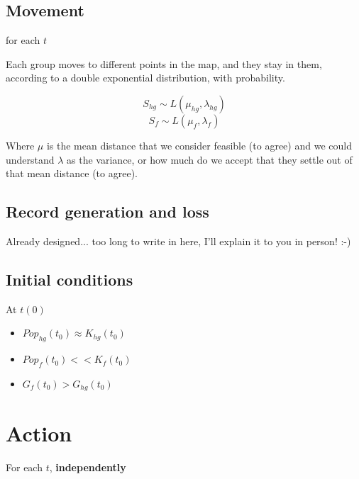 \documentclass{article}
\begin{document}
\subsection{Movement}
for each $t$

Each group moves to different points in the map, and they stay in them, according to a double exponential distribution, with probability.

$$S_{hg} \sim L(\mu_{hg}, \lambda_{hg})$$
$$S_{f} \sim L(\mu_{f}, \lambda_{f})$$

Where $\mu$ is the mean distance that we consider feasible (to agree) and we could understand $\lambda$ as the variance, or how much do we accept that they settle out of that mean distance (to agree).

\subsection{Record generation and loss}
Already designed... too long to write in here, I'll explain it to you in person! :-)

\subsection{Initial conditions}

At $t(0)$ 
\begin{itemize}
    \item $Pop_{hg}(t_{0}) \approx K_{hg}(t_{0})$
    \item $Pop_{f}(t_{0}) << K_{f}(t_{0})$
    \item $G_{f}(t_{0}) > G_{hg}(t_{0})$
\end{itemize}

\section{Action}
For each $t$, \textbf{independently}
\end{document}
